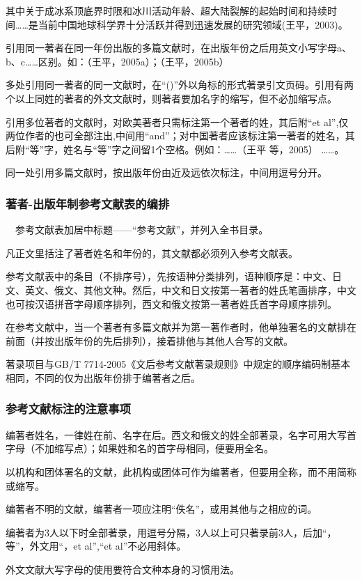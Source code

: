 其中关于成冰系顶底界时限和冰川活动年龄、超大陆裂解的起始时间和持续时间……是当前中国地球科学界十分活跃并得到迅速发展的研究领域(王平，2003)。

引用同一著者在同一年份出版的多篇文献时，在出版年份之后用英文小写字母a、b、c……区别。如：（王平，2005a）；（王平，2005b）

多处引用同一著者的同一文献时，在“()”外以角标的形式著录引文页码。引用有两个以上同姓的著者的外文文献时，则著者要加名字的缩写，但不必加缩写点。

引用多位著者的文献时，对欧美著者只需标注第一个著者的姓，其后附“et al”,仅两位作者的也可全部注出,中间用“and”；对中国著者应该标注第一著者的姓名，其后附“等”字，姓名与“等”字之间留1个空格。例如：……（王平 等，2005） ……。

同一处引用多篇文献时，按出版年份由近及远依次标注，中间用逗号分开。

\subsubsection{著者-出版年制参考文献表的编排}
　参考文献表加居中标题——“参考文献”，并列入全书目录。

凡正文里括注了著者姓名和年份的，其文献都必须列入参考文献表。

参考文献表中的条目（不排序号），先按语种分类排列，语种顺序是：中文、日文、英文、俄文、其他文种。然后，中文和日文按第一著者的姓氏笔画排序，中文也可按汉语拼音字母顺序排列，西文和俄文按第一著者姓氏首字母顺序排列。

在参考文献中，当一个著者有多篇文献并为第一著作者时，他单独署名的文献排在前面（并按出版年份的先后排列），接着排他与其他人合写的文献。

著录项目与GB/T 7714-2005《文后参考文献著录规则》中规定的顺序编码制基本相同，不同的仅为出版年份排于编著者之后。
\subsubsection{参考文献标注的注意事项}
编著者姓名，一律姓在前、名字在后。西文和俄文的姓全部著录，名字可用大写首字母（不加缩写点）；如果姓和名的首字母相同，便要用全名。

以机构和团体署名的文献，此机构或团体可作为编著者，但要用全称，而不用简称或缩写。

编著者不明的文献，编著者一项应注明“佚名”，或用其他与之相应的词。 

编著者为3人以下时全部著录，用逗号分隔，3人以上可只著录前3人，后加“，等”，外文用“，et al”,“et al”不必用斜体。

外文文献大写字母的使用要符合文种本身的习惯用法。

